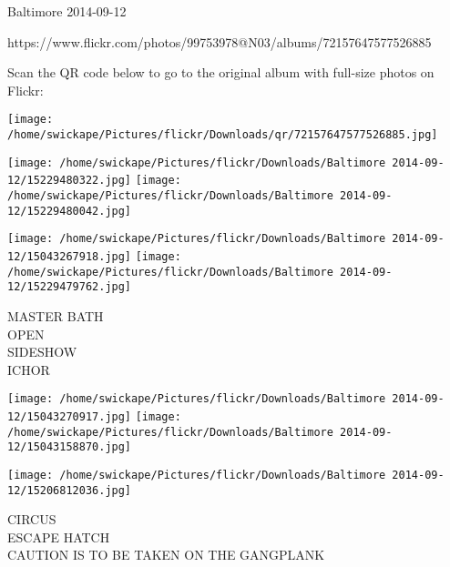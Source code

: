 \documentclass[10pt,letterpaper]{article}
\begin{document}
Baltimore 2014-09-12

https://www.flickr.com/photos/99753978@N03/albums/72157647577526885

Scan the QR code below to go to the original album with full-size photos on Flickr:

\texttt{[image: /home/swickape/Pictures/flickr/Downloads/qr/72157647577526885.jpg]}
\pagebreak

\texttt{[image: /home/swickape/Pictures/flickr/Downloads/Baltimore 2014-09-12/15229480322.jpg]}
\texttt{[image: /home/swickape/Pictures/flickr/Downloads/Baltimore 2014-09-12/15229480042.jpg]}

\texttt{[image: /home/swickape/Pictures/flickr/Downloads/Baltimore 2014-09-12/15043267918.jpg]}
\texttt{[image: /home/swickape/Pictures/flickr/Downloads/Baltimore 2014-09-12/15229479762.jpg]}

MASTER BATH\\
OPEN\\
SIDESHOW\\
ICHOR
\pagebreak

\texttt{[image: /home/swickape/Pictures/flickr/Downloads/Baltimore 2014-09-12/15043270917.jpg]}
\texttt{[image: /home/swickape/Pictures/flickr/Downloads/Baltimore 2014-09-12/15043158870.jpg]}

\texttt{[image: /home/swickape/Pictures/flickr/Downloads/Baltimore 2014-09-12/15206812036.jpg]}

CIRCUS\\
ESCAPE HATCH\\
CAUTION IS TO BE TAKEN ON THE GANGPLANK
\pagebreak
\end{document}
